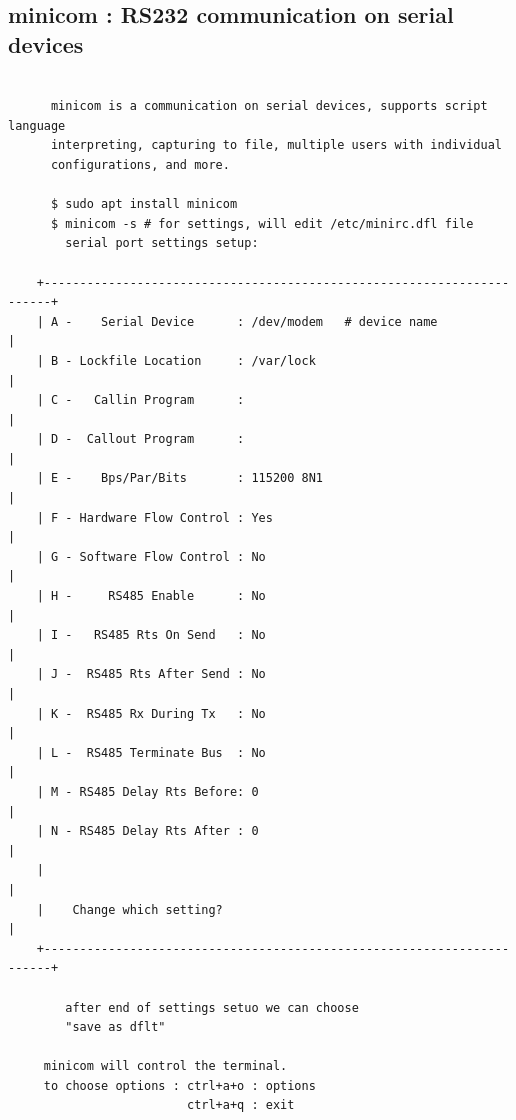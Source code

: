 \documentclass[a4paper,12pt]{article}
\begin{document}
\subsection{minicom : RS232 communication on serial devices }
\begin{verbatim}

      minicom is a communication on serial devices, supports script language
      interpreting, capturing to file, multiple users with individual    
      configurations, and more.
    
      $ sudo apt install minicom
      $ minicom -s # for settings, will edit /etc/minirc.dfl file
        serial port settings setup:

    +-----------------------------------------------------------------------+
    | A -    Serial Device      : /dev/modem   # device name                |
    | B - Lockfile Location     : /var/lock                                 |
    | C -   Callin Program      :                                           |
    | D -  Callout Program      :                                           |
    | E -    Bps/Par/Bits       : 115200 8N1                                |
    | F - Hardware Flow Control : Yes                                       |
    | G - Software Flow Control : No                                        |
    | H -     RS485 Enable      : No                                        |
    | I -   RS485 Rts On Send   : No                                        |
    | J -  RS485 Rts After Send : No                                        |
    | K -  RS485 Rx During Tx   : No                                        |
    | L -  RS485 Terminate Bus  : No                                        |
    | M - RS485 Delay Rts Before: 0                                         |
    | N - RS485 Delay Rts After : 0                                         |
    |                                                                       |
    |    Change which setting?                                              |
    +-----------------------------------------------------------------------+
        
        after end of settings setuo we can choose
        "save as dflt"
     
     minicom will control the terminal.
     to choose options : ctrl+a+o : options
                         ctrl+a+q : exit  
     
\end{verbatim}
\end{document}
